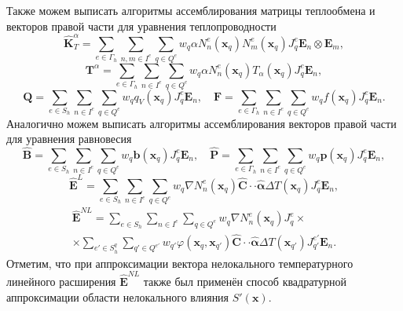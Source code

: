 Также можем выписать алгоритмы ассемблирования матрицы теплообмена и векторов правой части для уравнения теплопроводности
\[
	\widehat{\textbf{K}}^{\alpha}_T =
	\sum\limits_{e \in \Gamma_h}
	\sum\limits_{n,m \in I^{e}}
	\sum\limits_{q \in Q^e}
	w_q \alpha N_n^e (\boldsymbol{x}_q) N_m^e (\boldsymbol{x}_q) J_q^e \boldsymbol{E}_n \otimes \boldsymbol{E}_m,
\]
\[
	\textbf{T}^{\alpha} =
	\sum\limits_{e \in \Gamma_h}
	\sum\limits_{n \in I^{e}}
	\sum\limits_{q \in Q^e}
	w_q \alpha N_n^e (\boldsymbol{x}_q) T_{\alpha} (\boldsymbol{x}_q) J_q^e \boldsymbol{E}_n,
\]
\[
	\textbf{Q} =
	\sum\limits_{e \in S_h}
	\sum\limits_{n \in I^e}
	\sum\limits_{q \in Q^e}
	w_q q_V (\boldsymbol{x}_q) J_q^e \boldsymbol{E}_n,
	\quad
	\textbf{F} =
	\sum\limits_{e \in \Gamma_h}
	\sum\limits_{n \in I^e}
	\sum\limits_{q \in Q^e}
	w_q f (\boldsymbol{x}_q) J_q^e \boldsymbol{E}_n.
\]
Аналогично можем выписать алгоритмы ассемблирования векторов правой части для уравнения равновесия
\[
	\widehat{\textbf{B}} =
	\sum\limits_{e \in S_h}
	\sum\limits_{n \in I^e}
	\sum\limits_{q \in Q^e}
	w_q \boldsymbol{b} (\boldsymbol{x}_q) J_q^e \boldsymbol{E}_n,
	\quad
	\widehat{\textbf{P}} = 
	\sum\limits_{e \in \Gamma_h}
	\sum\limits_{n \in I^e}
	\sum\limits_{q \in Q^e}
	w_q \boldsymbol{p} (\boldsymbol{x}_q) J_q^e \boldsymbol{E}_n,
\]
\[
	\widehat{\textbf{E}}^L = 
	\sum\limits_{e \in S_h}
	\sum\limits_{n \in I^e}
	\sum\limits_{q \in Q^e}
	w_q \nabla N_n^e (\boldsymbol{x}_q) \widehat{\mathbf{C}} \cdot \cdot \widehat{\boldsymbol{\alpha}} \Delta T (\boldsymbol{x}_q) J_q^e \boldsymbol{E}_n,
\]
\begin{multline*}
	\widehat{\textbf{E}}^{NL} = 
	\sum\limits_{e \in S_h}
	\sum\limits_{n \in I^e}
	\sum\limits_{q \in Q^e}
	w_q \nabla N_n^e (\boldsymbol{x}_q) J_q^e 
	\times \\ \times
	\sum\limits_{e' \in S_h^q}
	\sum\limits_{q' \in Q^{e'}}
	w_{q'} \varphi (\boldsymbol{x}_q, \boldsymbol{x}_{q'}) \widehat{\mathbf{C}} \cdot \cdot \widehat{\boldsymbol{\alpha}} \Delta T (\boldsymbol{x}_{q'}) J_{q'}^{e'} \boldsymbol{E}_n.
\end{multline*}
Отметим, что при аппроксимации вектора нелокального температурного линейного расширения $\widehat{\textbf{E}}^{NL}$ также был применён способ квадратурной аппроксимации области нелокального влияния $S'(\boldsymbol{x})$.

